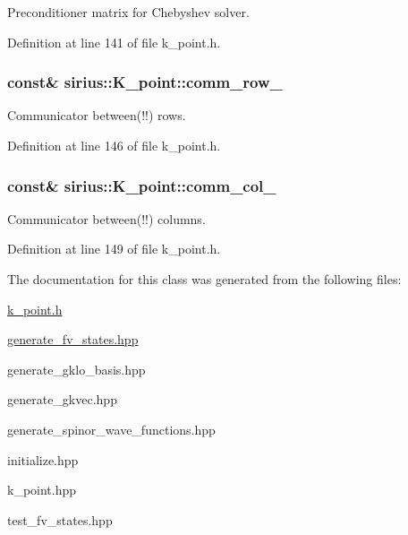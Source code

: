Preconditioner matrix for Chebyshev solver. 



Definition at line 141 of file k\+\_\+point.\+h.

\hypertarget{classsirius_1_1_k__point_a5445c11b9bf1b002c60e6f20bec22c20}{}
\subsubsection[{comm\+\_\+row\+\_\+}]{ const\& sirius\+::\+K\+\_\+point\+::comm\+\_\+row\+\_\+\hspace{0.3cm}{\ttfamily [private]}}\label{classsirius_1_1_k__point_a5445c11b9bf1b002c60e6f20bec22c20}


Communicator between(!!) rows. 



Definition at line 146 of file k\+\_\+point.\+h.

\hypertarget{classsirius_1_1_k__point_a1b3082dec0fd4c73b6d4518e4bdcc2b6}{}
\subsubsection[{comm\+\_\+col\+\_\+}]{ const\& sirius\+::\+K\+\_\+point\+::comm\+\_\+col\+\_\+\hspace{0.3cm}{\ttfamily [private]}}\label{classsirius_1_1_k__point_a1b3082dec0fd4c73b6d4518e4bdcc2b6}


Communicator between(!!) columns. 



Definition at line 149 of file k\+\_\+point.\+h.



The documentation for this class was generated from the following files\+:\begin{DoxyCompactItemize}
\item 
\hyperlink{k__point_8h}{k\+\_\+point.\+h}\item 
\hyperlink{generate__fv__states_8hpp}{generate\+\_\+fv\+\_\+states.\+hpp}\item 
generate\+\_\+gklo\+\_\+basis.\+hpp\item 
generate\+\_\+gkvec.\+hpp\item 
generate\+\_\+spinor\+\_\+wave\+\_\+functions.\+hpp\item 
initialize.\+hpp\item 
k\+\_\+point.\+hpp\item 
test\+\_\+fv\+\_\+states.\+hpp\end{DoxyCompactItemize}
